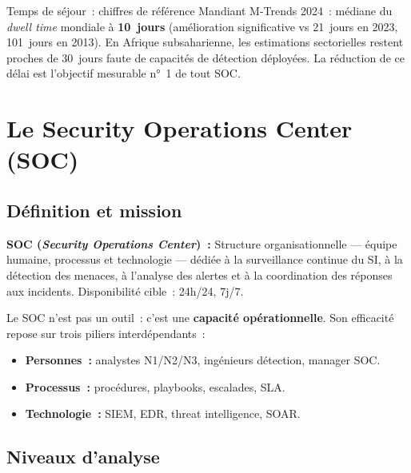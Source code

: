 \begin{boiteRemarque}{Temps de séjour~: chiffres de référence}
Mandiant M-Trends 2024~: médiane du \textit{dwell time} mondiale à
\textbf{10~jours} (amélioration significative vs 21~jours en 2023,
101~jours en 2013). En Afrique subsaharienne, les estimations sectorielles
restent proches de 30~jours faute de capacités de détection déployées.
La réduction de ce délai est l'objectif mesurable n°~1 de tout SOC.
\end{boiteRemarque}

\section{Le Security Operations Center (SOC)}
\label{sec:soc}

\subsection{Définition et mission}

\begin{boxdef}
\textbf{SOC (\textit{Security Operations Center})~:} Structure organisationnelle
— équipe humaine, processus et technologie — dédiée à la surveillance continue du
SI, à la détection des menaces, à l'analyse des alertes et à la coordination des
réponses aux incidents. Disponibilité cible~: 24h/24, 7j/7.
\end{boxdef}

Le SOC n'est pas un outil~: c'est une \textbf{capacité opérationnelle}. Son
efficacité repose sur trois piliers interdépendants~:
\begin{itemize}
  \item \textbf{Personnes~:} analystes N1/N2/N3, ingénieurs détection, manager SOC.
  \item \textbf{Processus~:} procédures, playbooks, escalades, SLA.
  \item \textbf{Technologie~:} SIEM, EDR, threat intelligence, SOAR.
\end{itemize}

\subsection{Niveaux d'analyse}

